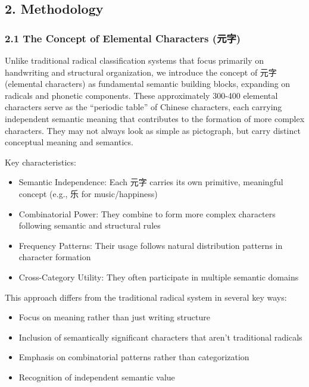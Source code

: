 \documentclass[
]{article}
\providecommand{\tightlist}{%
  \setlength{\itemsep}{0pt}\setlength{\parskip}{0pt}}
\begin{document}
\subsection{2. Methodology}\label{methodology}

\subsubsection{2.1 The Concept of Elemental Characters
(元字)}\label{the-concept-of-elemental-characters-ux5143ux5b57}

Unlike traditional radical classification systems that focus primarily
on handwriting and structural organization, we introduce the concept of
元字 (elemental characters) as fundamental semantic building blocks,
expanding on radicals and phonetic components. These approximately
300-400 elemental characters serve as the ``periodic table'' of Chinese
characters, each carrying independent semantic meaning that contributes
to the formation of more complex characters. They may not always look as
simple as pictograph, but carry distinct conceptual meaning and
semantics.

Key characteristics:

\begin{itemize}
\tightlist
\item
  Semantic Independence: Each 元字 carries its own primitive, meaningful
  concept (e.g., 乐 for music/happiness)
\item
  Combinatorial Power: They combine to form more complex characters
  following semantic and structural rules
\item
  Frequency Patterns: Their usage follows natural distribution patterns
  in character formation
\item
  Cross-Category Utility: They often participate in multiple semantic
  domains
\end{itemize}

This approach differs from the traditional radical system in several key
ways:

\begin{itemize}
\tightlist
\item
  Focus on meaning rather than just writing structure
\item
  Inclusion of semantically significant characters that aren't
  traditional radicals
\item
  Emphasis on combinatorial patterns rather than categorization
\item
  Recognition of independent semantic value
\end{itemize}
\end{document}
